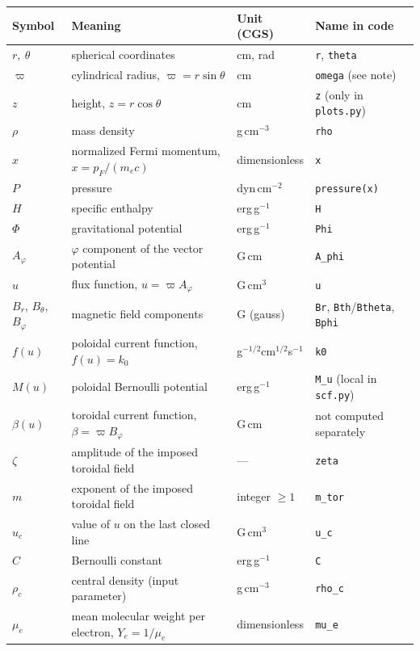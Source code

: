\documentclass[11pt,a4paper]{scrartcl}
\newcommand{\code}[1]{\texttt{\small #1}}
\begin{document}
\begingroup
\small
\begin{longtable}{@{}p{2.1cm}p{4.6cm}p{2.6cm}p{4.4cm}@{}}
\toprule
\textbf{Symbol} & \textbf{Meaning} & \textbf{Unit (CGS)} & \textbf{Name in code}\\
\midrule
\endhead
$r,\ \theta$ & spherical coordinates & cm, rad & \code{r}, \code{theta}\\
$\varpi$ & cylindrical radius, $\varpi = r\sin\theta$ & cm & \code{omega} (see note)\\
$z$ & height, $z = r\cos\theta$ & cm & \code{z} (only in \code{plots.py})\\
$\rho$ & mass density & g\,cm$^{-3}$ & \code{rho}\\
$x$ & normalized Fermi momentum, $x=p_F/(m_ec)$ & dimensionless & \code{x}\\
$P$ & pressure & dyn\,cm$^{-2}$ & \code{pressure(x)}\\
$H$ & specific enthalpy & erg\,g$^{-1}$ & \code{H}\\
$\Phi$ & gravitational potential & erg\,g$^{-1}$ & \code{Phi}\\
$A_\varphi$ & $\varphi$ component of the vector potential & G\,cm & \code{A\_phi}\\
$u$ & flux function, $u=\varpi A_\varphi$ & G\,cm$^3$ & \code{u}\\
$B_r$, $B_\theta$, $B_\varphi$ & magnetic field components & G (gauss) & \code{Br}, \code{Bth}/\code{Btheta}, \code{Bphi}\\
$f(u)$ & poloidal current function, $f(u)=k_0$ & g$^{-1/2}$cm$^{1/2}$s$^{-1}$ & \code{k0}\\
$M(u)$ & poloidal Bernoulli potential & erg\,g$^{-1}$ & \code{M\_u} (local in \code{scf.py})\\
$\beta(u)$ & toroidal current function, $\beta=\varpi B_\varphi$ & G\,cm & not computed separately\\
$\zeta$ & amplitude of the imposed toroidal field & --- & \code{zeta}\\
$m$ & exponent of the imposed toroidal field & integer $\ge1$ & \code{m\_tor}\\
$u_c$ & value of $u$ on the last closed line & G\,cm$^3$ & \code{u\_c}\\
$C$ & Bernoulli constant & erg\,g$^{-1}$ & \code{C}\\
$\rho_c$ & central density (input parameter) & g\,cm$^{-3}$ & \code{rho\_c}\\
$\mu_e$ & mean molecular weight per electron, $Y_e=1/\mu_e$ & dimensionless & \code{mu\_e}\\

\end{longtable}
\end{document}
